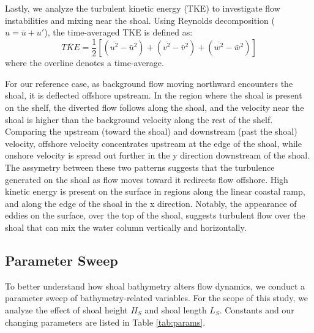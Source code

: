 Lastly, we analyze the turbulent kinetic energy (TKE) to investigate flow instabilities and mixing near the shoal. Using Reynolds decomposition ($u = \bar{u} + u'$), the time-averaged TKE is defined as:
\begin{equation}
    \overline{TKE} = \frac{1}{2} \left[ (\overline{u^2} - \bar{u}^2) + (\overline{v^2} - \bar{v}^2) + (\overline{w^2} - \bar{w}^2) \right]
\end{equation}
where the overline denotes a time-average.

For our reference case, as background flow moving northward encounters the shoal, it is deflected offshore upstream. In the region where the shoal is present on the shelf, the diverted flow follows along the shoal, and the velocity near the shoal is higher than the background velocity along the rest of the shelf. Comparing the upstream (toward the shoal) and downstream (past the shoal) velocity, offshore velocity concentrates upstream at the edge of the shoal, while onshore velocity is spread out further in the y direction downstream of the shoal. The assymetry between these two patterns suggests that the turbulence generated on the shoal as flow moves toward it redirects flow offshore. High kinetic energy is present on the surface in regions along the linear coastal ramp, and along the edge of the shoal in the x direction. Notably, the appearance of eddies on the surface, over the top of the shoal, suggests turbulent flow over the shoal that can mix the water column vertically and horizontally. 

\subsection{Parameter Sweep}

To better understand how shoal bathymetry alters flow dynamics, we conduct a parameter sweep of bathymetry-related variables. For the scope of this study, we analyze the effect of shoal height $H_S$ and shoal length $L_S$. Constants and our changing parameters are listed in Table \ref{tab:params}. 

